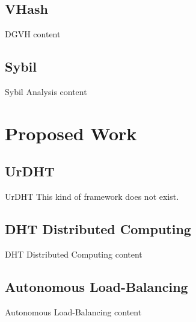 \documentclass[11pt,aspectratio=169]{beamer}
\begin{document}
\subsection{VHash}


\begin{frame}{DGVH}
	content
\end{frame}


\subsection{Sybil}

\begin{frame}{Sybil Analysis}
	content
\end{frame}

\section{Proposed Work}



\subsection{UrDHT}
\begin{frame}{UrDHT}
	This kind of framework does not exist.
\end{frame}


\subsection{DHT Distributed Computing}
\begin{frame}{DHT Distributed Computing}
	content
\end{frame}



\subsection{Autonomous Load-Balancing}
\begin{frame}{Autonomous Load-Balancing}
	content
\end{frame}




\end{document}
